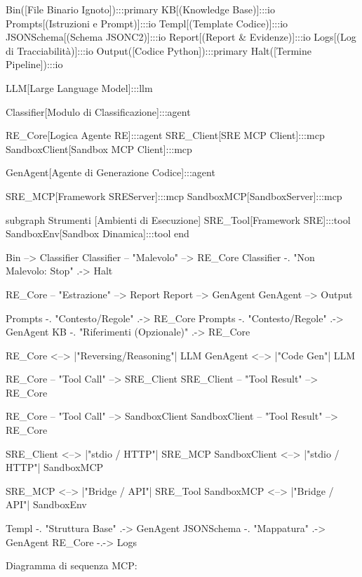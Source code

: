 Bin([File Binario Ignoto]):::primary
KB[(Knowledge Base)]:::io
Prompts[(Istruzioni e Prompt)]:::io
Templ[(Template Codice)]:::io
JSONSchema[(Schema JSON\nComandi C2)]:::io
Report[(Report & Evidenze)]:::io
Logs[(Log di Tracciabilità)]:::io
Output([Codice Python\nIntercettazione]):::primary
Halt([Termine Pipeline]):::io

LLM[Large Language Model]:::llm

Classifier[Modulo di Classificazione]:::agent

RE_Core[Logica Agente RE]:::agent
SRE_Client[SRE MCP Client]:::mcp
SandboxClient[Sandbox MCP Client]:::mcp

GenAgent[Agente di Generazione Codice]:::agent

SRE_MCP[Framework SRE\nMCP Server]:::mcp
SandboxMCP[Sandbox\nMCP Server]:::mcp

subgraph Strumenti [Ambienti di Esecuzione]
    SRE_Tool[Framework SRE]:::tool
    SandboxEnv[Sandbox Dinamica]:::tool
end

Bin --> Classifier
Classifier -- "Malevolo" --> RE_Core
Classifier -. "Non Malevolo: Stop" .-> Halt

RE_Core -- "Estrazione" --> Report
Report --> GenAgent
GenAgent --> Output

Prompts -. "Contesto/Regole" .-> RE_Core
Prompts -. "Contesto/Regole" .-> GenAgent
KB -. "Riferimenti (Opzionale)" .-> RE_Core

RE_Core <--> |"Reversing/Reasoning"| LLM
GenAgent <--> |"Code Gen"| LLM

RE_Core -- "Tool Call" --> SRE_Client
SRE_Client -- "Tool Result" --> RE_Core

RE_Core -- "Tool Call" --> SandboxClient
SandboxClient -- "Tool Result" --> RE_Core

SRE_Client <--> |"stdio / HTTP"| SRE_MCP
SandboxClient <--> |"stdio / HTTP"| SandboxMCP

SRE_MCP <--> |"Bridge / API"| SRE_Tool
SandboxMCP <--> |"Bridge / API"| SandboxEnv

Templ -. "Struttura Base" .-> GenAgent
JSONSchema -. "Mappatura" .-> GenAgent
RE_Core -.-> Logs
\fi

Diagramma di sequenza MCP:

